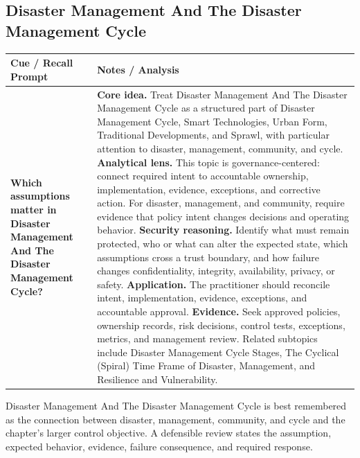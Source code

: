 \documentclass[11pt]{article}
\newcommand{\CornellHeader}{%
\rowcolor{Navy}\color{white}\bfseries Cue / Recall Prompt & \color{white}\bfseries Notes / Analysis\\\hline}
\newcommand{\CornellRow}[2]{%
\cellcolor{CueGray}\RaggedRight\textbf{#1} & \RaggedRight #2\\\hline}
\begin{document}
\subsection*{Disaster Management And The Disaster Management Cycle}
\begin{longtable}{>{\RaggedRight\arraybackslash}p{}|>{\RaggedRight\arraybackslash}p{}}
\CornellHeader
\CornellRow{Which assumptions matter in Disaster Management And The Disaster Management Cycle?}{\textbf{Core idea.} Treat Disaster Management And The Disaster Management Cycle as a structured part of Disaster Management Cycle, Smart Technologies, Urban Form, Traditional Developments, and Sprawl, with particular attention to disaster, management, community, and cycle. \textbf{Analytical lens.} This topic is governance-centered: connect required intent to accountable ownership, implementation, evidence, exceptions, and corrective action. For disaster, management, and community, require evidence that policy intent changes decisions and operating behavior. \textbf{Security reasoning.} Identify what must remain protected, who or what can alter the expected state, which assumptions cross a trust boundary, and how failure changes confidentiality, integrity, availability, privacy, or safety. \textbf{Application.} The practitioner should reconcile intent, implementation, evidence, exceptions, and accountable approval. \textbf{Evidence.} Seek approved policies, ownership records, risk decisions, control tests, exceptions, metrics, and management review. Related subtopics include Disaster Management Cycle Stages, The Cyclical (Spiral) Time Frame of Disaster, Management, and Resilience and Vulnerability.}
\end{longtable}
\begin{topicsummary}
Disaster Management And The Disaster Management Cycle is best remembered as the connection between disaster, management, community, and cycle and the chapter's larger control objective. A defensible review states the assumption, expected behavior, evidence, failure consequence, and required response.
\end{topicsummary}
\end{document}
